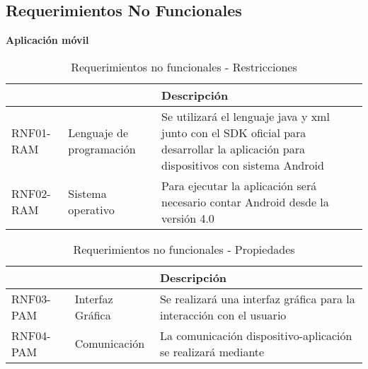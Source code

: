 \subsection{Requerimientos No Funcionales} 
  
\textbf{Aplicación móvil}
\begin{center}
\begin{table}[!htb]
\centering
\begin{tabular}{|p{4cm}|p{4cm}|p{5cm}|}
    \hline
    \centering {\bfseries }  & \centering {\bfseries Nombre} & {\bfseries Descripción} \\ \hline
    \centering RNF01-RAM & \centering Lenguaje de programación & Se utilizará el lenguaje java y xml junto con el SDK oficial para desarrollar la aplicación para dispositivos con sistema Android \\ \hline
    \centering RNF02-RAM & \centering Sistema operativo & Para ejecutar la aplicación será necesario contar Android desde la versión 4.0\\ \hline
\end{tabular}
\caption{Requerimientos no funcionales - Restricciones}
\end{table}
\end{center}
    

\begin{center}
\begin{table}[!htb]
\centering
\begin{tabular}{|p{4cm}|p{4cm}|p{5cm}|}
    \hline
    \centering {\bfseries }  & \centering {\bfseries Nombre} & {\bfseries Descripción} \\ \hline
    \centering RNF03-PAM & \centering Interfaz Gráfica & Se realizará una interfaz gráfica para la interacción con el usuario \\ \hline 
    \centering RNF04-PAM &  \centering Comunicación & La comunicación dispositivo-aplicación se realizará mediante \\
    \hline
\end{tabular}
\caption{Requerimientos no funcionales - Propiedades}
\label{tabla:}
\end{table}
\end{center}


